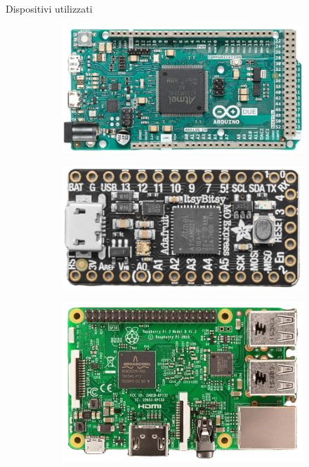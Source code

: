 
\begin{frame}{Dispositivi utilizzati}

\begin{figure}
    \centering
    \begin{subfigure}[m]{0.30\textwidth}
        \centering
        \includegraphics[height=0.49\textwidth]{images/arduino.png}
    \end{subfigure}
    \hfill \hfill \hfill
    \begin{subfigure}[m]{0.36\textwidth}
        \centering
        \includegraphics[height=0.40\textwidth]{images/adafruit.png}
    \end{subfigure}
    \hfill
    \begin{subfigure}[m]{0.30\textwidth}
    \centering
        \includegraphics[height=0.48\textwidth]{images/raspberry.png}
    \end{subfigure}
\end{figure}

\end{frame}

